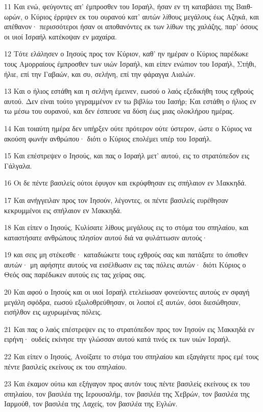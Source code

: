 \par 11 Και ενώ, φεύγοντες απ' έμπροσθεν του Ισραήλ, ήσαν εν τη καταβάσει της Βαιθ-ωρών, ο Κύριος έρριψεν εκ του ουρανού κατ' αυτών λίθους μεγάλους έως Αζηκά, και απέθανον· περισσότεροι ήσαν οι αποθανόντες εκ των λίθων της χαλάζης, παρ' όσους οι υιοί Ισραήλ κατέκοψαν εν μαχαίρα.
\par 12 Τότε ελάλησεν ο Ιησούς προς τον Κύριον, καθ' ην ημέραν ο Κύριος παρέδωκε τους Αμορραίους έμπροσθεν των υιών Ισραήλ, και είπεν ενώπιον του Ισραήλ, Στήθι, ήλιε, επί την Γαβαών, και συ, σελήνη, επί την φάραγγα Αιαλών.
\par 13 Και ο ήλιος εστάθη και η σελήνη έμεινεν, εωσού ο λαός εξεδικήθη τους εχθρούς αυτού. Δεν είναι τούτο γεγραμμένον εν τω βιβλίω του Ιασήρ; Και εστάθη ο ήλιος εν τω μέσω του ουρανού, και δεν έσπευσε να δύση έως μιας ολοκλήρου ημέρας.
\par 14 Και τοιαύτη ημέρα δεν υπήρξεν ούτε πρότερον ούτε ύστερον, ώστε ο Κύριος να ακούση φωνήν ανθρώπου· διότι ο Κύριος επολέμει υπέρ του Ισραήλ.
\par 15 Και επέστρεψεν ο Ιησούς, και πας ο Ισραήλ μετ' αυτού, εις το στρατόπεδον εις Γάλγαλα.
\par 16 Οι δε πέντε βασιλείς ούτοι έφυγον και εκρύφθησαν εις σπήλαιον εν Μακκηδά.
\par 17 Και ανήγγειλαν προς τον Ιησούν, λέγοντες, οι πέντε βασιλείς ευρέθησαν κεκρυμμένοι εις σπήλαιον εν Μακκηδά.
\par 18 Και είπεν ο Ιησούς, Κυλίσατε λίθους μεγάλους εις το στόμα του σπηλαίου, και καταστήσατε ανθρώπους πλησίον αυτού διά να φυλάττωσιν αυτούς·
\par 19 και σεις μη στέκεσθε· καταδιώκετε τους εχθρούς σας και πατάξατε το όπισθεν αυτών· μη αφήσητε αυτούς να εισέλθωσιν εις τας πόλεις αυτών· διότι Κύριος ο Θεός σας παρέδωκεν αυτούς εις τας χείρας σας.
\par 20 Και αφού ο Ιησούς και οι υιοί Ισραήλ ετελείωσαν φονεύοντες αυτούς εν σφαγή μεγάλη σφόδρα, εωσού εξωλοθρεύθησαν, οι λοιποί εξ αυτών, όσοι διεσώθησαν, εισήλθον εις ωχυρωμένας πόλεις.
\par 21 Και πας ο λαός επέστρεψεν εις το στρατόπεδον προς τον Ιησούν εις Μακκηδά εν ειρήνη· ουδείς εκίνησε την γλώσσαν αυτού κατά τινός εκ των υιών Ισραήλ.
\par 22 Και είπεν ο Ιησούς, Ανοίξατε το στόμα του σπηλαίου και εξαγάγετε προς εμέ τους πέντε βασιλείς εκείνους εκ του σπηλαίου.
\par 23 Και έκαμον ούτω και εξήγαγον προς αυτόν τους πέντε βασιλείς εκείνους εκ του σπηλαίου, τον βασιλέα της Ιερουσαλήμ, τον βασιλέα της Χεβρών, τον βασιλέα της Ιαρμούθ, τον βασιλέα της Λαχείς, τον βασιλέα της Εγλών.
